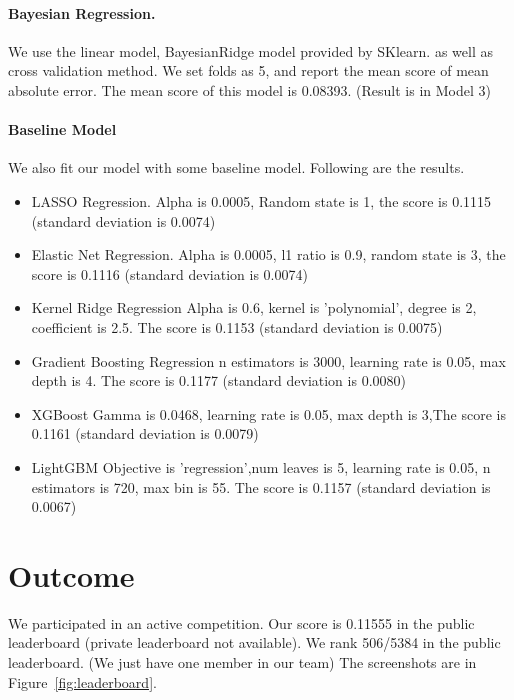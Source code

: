 \documentclass[11pt]{article}
\numberwithin{equation}{section}
\begin{document}
\paragraph{Bayesian Regression.}
We use the linear model, BayesianRidge model provided by SKlearn. as well as cross validation method. We set folds as 5, and report the mean score of mean absolute error.
The mean score of this model is 0.08393. (Result is in Model 3)

\paragraph{Baseline Model}

We also fit our model with some baseline model. Following are the results.
\begin{itemize}
	\item 
	LASSO Regression.
	Alpha is 0.0005, Random state is 1, the score is 0.1115 (standard deviation is 0.0074)
	\item 
	Elastic Net Regression.
	Alpha is 0.0005, l1 ratio is 0.9, random state is 3, the score is 0.1116 (standard deviation is 0.0074)
	\item
	Kernel Ridge Regression
	Alpha is 0.6, kernel is 'polynomial', degree is 2, coefficient is 2.5. The score is 0.1153 (standard deviation is 0.0075)
	\item
	Gradient Boosting Regression
	n estimators is 3000, learning rate is 0.05, max depth is 4. The score is 0.1177 (standard deviation is 0.0080)
	\item
	XGBoost
	Gamma is 0.0468, learning rate is 0.05, max depth is 3,The score is 0.1161 (standard deviation is 0.0079)
	\item
	LightGBM
	Objective is 'regression',num leaves is 5, learning rate is 0.05, n estimators is 720, max bin is 55. The score is 0.1157 (standard deviation is 0.0067)
\end{itemize}



\section{Outcome}


We participated in an active competition.
Our score is 0.11555 in the public leaderboard (private leaderboard not available).
We rank 506/5384 in the public leaderboard.
(We just have one member in our team)
The screenshots are in Figure~\ref{fig:leaderboard}.
\end{document}
